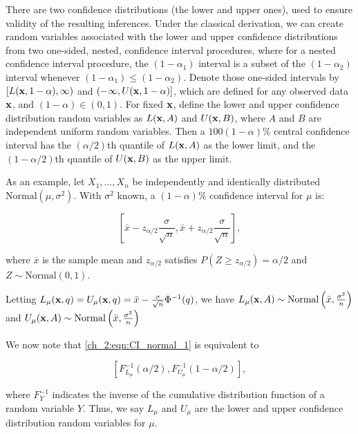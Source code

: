 There are two confidence distributions (the lower and upper ones), used to ensure validity of the resulting inferences.
Under the classical derivation, we can create random variables associated with the lower and upper confidence distributions from two one-sided, nested, confidence interval procedures, where for a nested confidence interval procedure, the $(1-\alpha_1)$ interval is a subset of the $(1-\alpha_2)$ interval whenever $(1-\alpha_1) \leq (1-\alpha_2)$.
Denote those one-sided intervals by $[L({\bf x},1-\alpha), \infty)$ and $(-\infty, U({\bf x},1-\alpha)]$, which are defined for any observed data ${\bf x}$, and $(1-\alpha) \in (0,1)$.
For fixed ${\bf x}$, define the lower and upper confidence distribution random variables as $L({\bf x}, A)$ and $U({\bf x},B)$, where $A$ and $B$ are independent uniform random variables.
Then a $100(1-\alpha)\%$ central confidence interval has the $(\alpha/2)$th quantile of $L({\bf x}, A)$ as the lower limit, and the $(1-\alpha/2)$th quantile of $U({\bf x},B)$ as the upper limit.

As an example, let \( X_1, \ldots, X_n \) be independently and identically distributed \( \textrm{Normal}(\mu, \sigma^2) \).
With \( \sigma^2 \) known, a \( (1 - \alpha) \)\% confidence interval for \( \mu \) is:

\begin{equation}
\left[ \bar{x} - z_{\alpha/2} \frac{\sigma}{\sqrt{n}}, \bar{x} + z_{\alpha/2} \frac{\sigma}{\sqrt{n}} \right],
\label{ch_2:eqn:CI_normal_1}
\end{equation}

where \( \bar{x} \) is the sample mean and \( z_{\alpha / 2} \) satisfies \( P(Z \geq z_{\alpha / 2}) = \alpha / 2 \) and \( Z \sim \textrm{Normal}(0,1) \).

Letting \( L_\mu (\mathbf{x}, q) = U_\mu (\mathbf{x}, q) = \bar{x} - \frac{\sigma}{\sqrt{n}} \Phi^{-1}(q) \), we have \( L_\mu(\mathbf{x}, A) \sim \textrm{Normal} \left( \bar{x}, \frac{\sigma^2}{n} \right) \) and \( U_\mu(\mathbf{x}, A) \sim \textrm{Normal} \left( \bar{x}, \frac{\sigma^2}{n} \right) \)

We now note that \eqref{ch_2:eqn:CI_normal_1} is equivalent to

\[ \left[ F_{L_{\mu}}^{-1}(\alpha / 2), F_{U_{\mu}}^{-1}(1- \alpha / 2) \right], \]

where \( F_Y^{-1} \) indicates the inverse of the cumulative distribution function of a random variable \( Y \).
Thus, we say \( L_\mu \) and \( U_\mu \) are the lower and upper confidence distribution random variables for \( \mu \).

